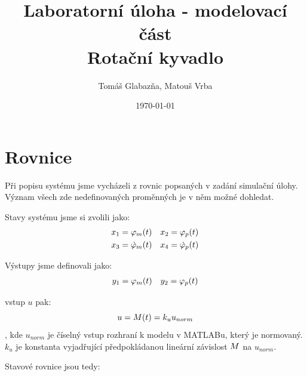 \documentclass[11pt,a4paper]{article}
\title{%
  Laboratorní úloha - modelovací část\\
  \large Rotační kyvadlo}
\author{Tomáš Glabazňa, Matouš Vrba}
\date{\today}
\begin{document}
\maketitle

\clearpage






\section{Rovnice}
\renewcommand{\u}{u}
\newcommand{\x}[2][]{ %
  \ifstrequal{#1}{t} %
   	{x_{#2}(t)} %
    {x_{#2}}    %
}
\newcommand{\xd}[2][]{
  \ifstrequal{#1}{t} 
   	{\dot{x}_{#2}(t)}
    {\dot{x}_{#2}}
}
\newcommand{\y}[1]{y_{#1}}
\newcommand{\M}[1][]{
	\ifstrequal{#1}{t}
	{M(t)}
	{M}
}
\newcommand{\ku}{k_{u}}
\newcommand{\un}{u_{norm}}
\newcommand{\phid}[2][]{
	\ifstrequal{#1}{t}
	{\dot{\varphi}_{#2}(t)}
	{\dot{\varphi}_{#2}}
	}
\newcommand{\phidd}[1]{\ddot{\varphi}_{#1}}
\newcommand{\phin}[2][]{ %
	\ifstrequal{#1}{t}	
	{\varphi_{#2}(t)}
	{\varphi_{#2}}
	}
\newcommand{\coss}[1]{\cos{(#1)}}
\newcommand{\sinn}[1]{\sin{(#1)}}
\newcommand{\sinnN}[1]{\sin^2{(#1)}} %

Při popisu systému jsme vycházeli z rovnic popsaných v zadání simulační úlohy. Význam všech zde nedefinovaných proměnných je v něm možné dohledat.

Stavy systému jsme si zvolili jako:
\begin{align*}
& \x{1} = \phin[t]{m}		 && 		\x{2} = \phin[t]{p} \\
& \x{3} = \phid[t]{m}		 &&		\x{4} = \phid[t]{p} \\
\end{align*}

Výstupy jsme definovali jako:
\begin{align*}
& \y{1} = \phin[t]{m}		 &&		\y{2} = \phin[t]{p} \\
\end{align*}

vstup $\u$ pak:
$$
\u = \M[t] = \ku \un
$$
, kde $\un$ je číselný vstup rozhraní k modelu v MATLABu, který je normovaný. $k_u$ je konstanta vyjadřující předpokládanou lineární závislost $\M$ na $\un$.

Stavové rovnice jsou tedy:
\end{document}
